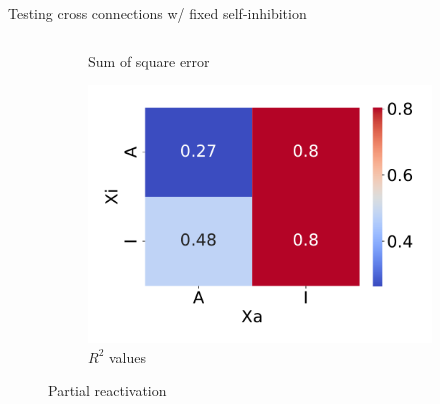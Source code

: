 \documentclass[aspectratio=169,9pt]{beamer}
\begin{document}
\begin{frame}{Testing cross connections w/ fixed self-inhibition}
\begin{columns}
\begin{column}{0.3\textwidth}
\begin{figure}[h]
\begin{subfigure}[b]{\textwidth}
                            \caption{Sum of square error}
                        \end{subfigure}
                        \begin{subfigure}[b]{\textwidth}
                            \centering
                            \includegraphics[width=\textwidth]{vary_cross-II-Partial_timeshifted-rsq-hmap}
                            \caption{$R^2$ values}
                        \end{subfigure}
                    \caption{Partial reactivation}
                \end{figure}
            \end{column}
        \end{columns}
    \end{frame}
\end{document}
